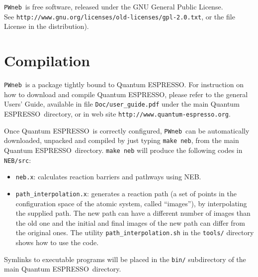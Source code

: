 \documentclass[12pt,a4paper]{article}
\def\qe{{\sc Quantum ESPRESSO}}
\def\NEB{\texttt{PWneb}} %
\def\nebx{\texttt{neb.x}}
\begin{document}
\NEB\ is free software, released under the 
GNU General Public License. \\ See
\texttt{http://www.gnu.org/licenses/old-licenses/gpl-2.0.txt}, 
or the file License in the distribution).
    


\section{Compilation}

\NEB\ is a package tightly bound to \qe.
For instruction on how to download and compile \qe, please refer 
to the general Users' Guide, available in file \texttt{Doc/user\_guide.pdf}
under the main \qe\ directory, or in web site 
\texttt{http://www.quantum-espresso.org}.

Once \qe\ is correctly configured, \NEB\ can be automatically 
downloaded, unpacked and compiled by
just typing \texttt{make neb}, from the main \qe\ directory.
\texttt{make neb} will produce 
the following codes in \texttt{NEB/src}:
\begin{itemize}
\item \nebx: calculates reaction barriers and pathways using NEB.
\item \texttt{path\_interpolation.x}: generates a reaction path (a set of points
in the configuration space of the atomic system, called ``images''), by
 interpolating the supplied path. The new path can have a 
 different number of images than the old one and the initial and final 
 images of the new path can differ from the original ones.
 The utility \texttt{path\_interpolation.sh} in the \texttt{tools/}
 directory shows how to use the code.
\end{itemize}

Symlinks to executable programs will be placed in the
\texttt{bin/} subdirectory of the main \qe\  directory.
\end{document}
